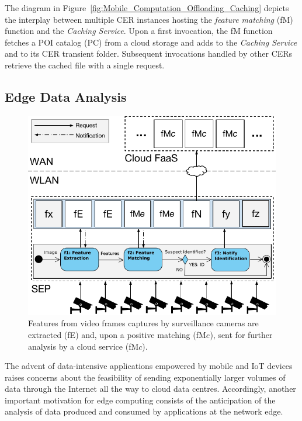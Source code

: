 The diagram in Figure~\ref{fig:Mobile_Computation_Offloading_Caching} depicts the interplay between multiple CER instances hosting the \textit{feature matching} (fM) function and the \textit{Caching Service}. Upon a first invocation, the fM function fetches a POI catalog (PC) from a cloud storage and adds to the \textit{Caching Service} and to its CER transient folder. Subsequent invocations handled by other CERs retrieve the cached file with a single request.


\subsection{Edge Data Analysis}\label{sec:SEP_EDA}

\begin{figure}[bp]
	\centering
	\includegraphics[width=\linewidth]{Figs/Edge_Data_Analytics_Video_Surveillance.pdf}
	\caption{Features from video frames captures by surveillance cameras are extracted (fE) and, upon a positive matching (fM$e$), sent for further analysis by a cloud service (fM$c$).}
	\label{fig:Edge_Data_Analytics_Video_Surveillance}
\end{figure}

The advent of data-intensive applications empowered by mobile and IoT devices raises concerns about the feasibility of sending exponentially larger volumes of data through the Internet all the way to cloud data centres. Accordingly, another important motivation for edge computing consists of the anticipation of the analysis of data produced and consumed by applications at the network edge. 

